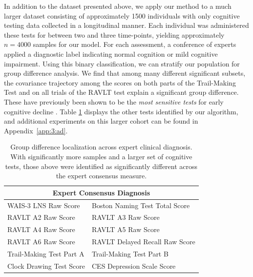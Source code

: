 In addition to the dataset presented above, we apply our method to a much larger dataset consisting of approximately 1500 individuals with only cognitive testing data collected in a longitudinal manner. Each individual was administered these tests for between two and three time-points, yielding approximately $n = 4000$ samples for our model. For each assessment, a conference of experts applied a diagnostic label indicating normal cognition or mild cognitive impairment. Using this binary classification, we can stratify our population for group difference analysis.
We find that among many different significant subsets, the covariance trajectory among the scores on both parts of the Trail-Making Test and 
on all trials of the RAVLT test explain a significant group difference. These have previously been shown to be the {\em most sensitive tests} for 
early cognitive decline \citep{albert2001preclinical}. 
Table \ref{tab:wrapCC} displays the other tests identified by our algorithm, and additional experiments on this larger cohort 
can be found in Appendix~\ref{app:3:ad}. 
%

\begin{table}
	\centering
	\begin{tabular}{ll}
		\toprule
		\multicolumn{2}{c}{\textbf{Expert Consensus Diagnosis}}\\ \midrule \midrule
		WAIS-3 LNS Raw Score &
		Boston Naming Test Total Score \\
		RAVLT A2 Raw Score &
		RAVLT A3 Raw Score \\
		RAVLT A4 Raw Score &
		RAVLT A5 Raw Score \\
		RAVLT A6 Raw Score &
		RAVLT Delayed Recall Raw Score \\
		Trail-Making Test Part A &
		Trail-Making Test Part B \\
		Clock Drawing Test Score &
		CES Depression Scale Score \\
		\bottomrule
		\bottomrule
	\end{tabular}
	\caption[Localized results across expert clinical diagnosis]{Group difference localization across expert clinical diagnosis. With significantly more samples and a larger set of cognitive tests, those above were identified as significantly different across the expert consensus measure.}
	\label{tab:wrapCC}
\end{table}

